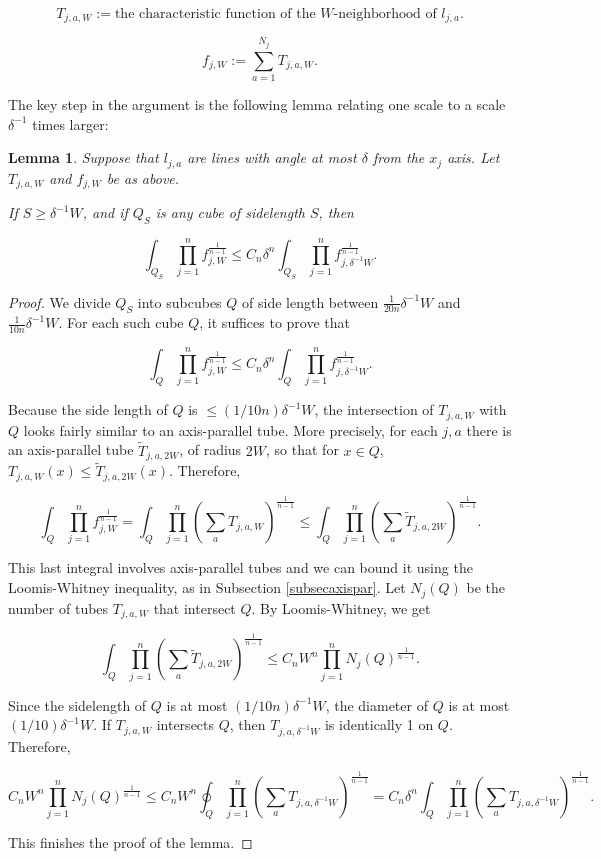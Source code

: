 \documentclass{amsart}
\newtheorem{lemma}[prop]{Lemma}
\begin{document}
$$ T_{j,a, W} := \textrm{the characteristic function of the $W$-neighborhood of } l_{j,a}. $$

$$ f_{j, W} := \sum_{a = 1}^{N_j} T_{j, a , W}. $$

The key step in the argument is the following lemma relating one scale to a scale $\delta^{-1}$ times larger:

\begin{lemma} \label{mainlemma} Suppose that $l_{j,a}$ are lines with angle at most $\delta$ from the $x_j$ axis.  Let $T_{j, a, W}$ and $f_{j, W}$ be as above.  

If $S \ge \delta^{-1} W$, and if $Q_S$ is any cube of sidelength $S$, then

$$ \int_{Q_S} \prod_{j=1}^n f_{j, W}^\frac{1}{n-1} \le C_n \delta^n \int_{Q_S} \prod_{j=1}^n f_{j, \delta^{-1} W}^\frac{1}{n-1}. $$

\end{lemma}

\begin{proof} We divide $Q_S$ into subcubes $Q$ of side length between $\frac{1}{20n} \delta^{-1} W$ and $\frac{1}{10n} \delta^{-1} W$.  For each such cube $Q$, it suffices to prove that

$$ \int_{Q} \prod_{j=1}^n f_{j, W}^\frac{1}{n-1} \le C_n \delta^n \int_{Q} \prod_{j=1}^n f_{j, \delta^{-1} W}^\frac{1}{n-1}. $$

Because the side length of $Q$ is $\le (1/10n) \delta^{-1} W$, the intersection of $T_{j, a, W}$ with $Q$ looks fairly similar to an axis-parallel tube.  More precisely, for each $j,a$ there is an axis-parallel tube $\tilde T_{j,a, 2W}$, of radius $2 W$, so that for $x \in Q$, $T_{j, a, W} (x) \le \tilde T_{j, a, 2 W}(x)$.  Therefore, 

$$ \int_{Q} \prod_{j=1}^n f_{j, W}^\frac{1}{n-1} = \int_{Q} \prod_{j=1}^n \left( \sum_a T_{j, a, W} \right)^\frac{1}{n-1} \le   \int_{Q} \prod_{j=1}^n \left( \sum_a \tilde T_{j, a, 2W} \right)^\frac{1}{n-1} . $$

This last integral involves axis-parallel tubes and we can bound it using the Loomis-Whitney inequality, as in Subsection \ref{subsecaxispar}.  Let $N_j(Q)$ be the number of tubes $T_{j, a, W}$ that intersect $Q$.  By Loomis-Whitney, we get 

$$  \int_{Q} \prod_{j=1}^n \left( \sum_a \tilde T_{j, a, 2W} \right)^\frac{1}{n-1} \le C_n W^n \prod_{j=1}^n N_j(Q)^\frac{1}{n-1}. $$

Since the sidelength of $Q$ is at most $(1/ 10n) \delta^{-1} W$, the diameter of $Q$ is at most $(1/10) \delta^{-1} W$.  If $T_{j, a, W}$ intersects $Q$, then $T_{j, a, \delta^{-1} W}$ is identically 1 on $Q$.  Therefore,

$$ C_n W^n \prod_{j=1}^n N_j(Q)^\frac{1}{n-1} \le C_n W^n \oint_Q \prod_{j=1}^n \left( \sum_{a} T_{j, a, \delta^{-1} W} \right)^\frac{1}{n-1}  = C_n \delta^n \int_Q \prod_{j=1}^n \left( \sum_{a} T_{j, a, \delta^{-1} W} \right)^\frac{1}{n-1}. $$

This finishes the proof of the lemma.   \end{proof}
\end{document}
